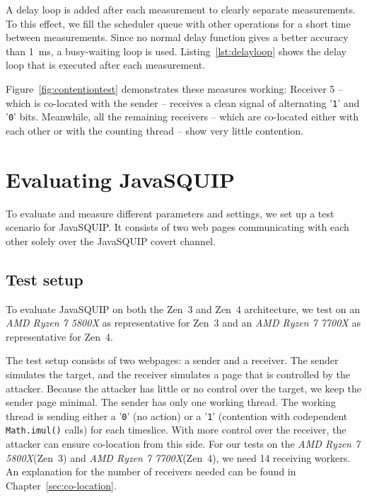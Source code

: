 \documentclass[11pt,
  titlepage=false,
  parskip=half,      %
]{scrreprt}
\begin{document}
A delay loop is added after each measurement to clearly separate measurements.
To this effect, we fill the scheduler queue with other operations for a short time between measurements.
Since no normal delay function gives a better accuracy than 1~ms, a busy-waiting loop is used.
Listing~\ref{lst:delayloop} shows the delay loop that is executed after each measurement.


Figure~\ref{fig:contentiontest} demonstrates these measures working:
Receiver 5 -- which is co-located with the sender -- receives a clean signal of alternating '\texttt{1}' and '\texttt{0}' bits.
Meanwhile, all the remaining receivers -- which are co-located either with each other or with the counting thread -- show very little contention.


\chapter{Evaluating JavaSQUIP}
\label{ch:evaluation}

To evaluate and measure different parameters and settings, we set up a test scenario for JavaSQUIP.
It consists of two web pages communicating with each other solely over the JavaSQUIP covert channel.

\section {Test setup}
\label{sec:testsetup}
To evaluate JavaSQUIP on both the Zen~3 and Zen~4 architecture,
we test on an \textit{AMD Ryzen 7 5800X} as representative for Zen~3 and an \textit{AMD Ryzen 7 7700X} as representative for Zen~4.

The test setup consists of two webpages: a sender and a receiver.
The sender simulates the target, and the receiver simulates a page that is controlled by the attacker.
Because the attacker has little or no control over the target, we keep the sender page minimal.
The sender has only one working thread.
The working thread is sending either a '\texttt{0}' (no action) or a '\texttt{1}' (contention with codependent \texttt{Math.imul()} calls) for each timeslice.
With more control over the receiver, the attacker can ensure co-location from this side.
For our tests on the \textit{AMD Ryzen 7 5800X}(Zen~3) and \textit{AMD Ryzen 7 7700X}(Zen~4), we need 14 receiving workers.
An explanation for the number of receivers needed can be found in Chapter~\ref{sec:co-location}.
\end{document}
